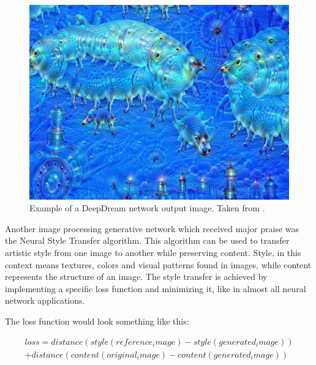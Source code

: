 \documentclass[b5paper]{book}
\let\cite\parencite
\begin{document}
\begin{figure}
    \centering
    \includegraphics[scale=0.2]{figures/deepdream.png}
    \caption{Example of a DeepDream network output image. Taken from \cite{chollet2018deep}.}
    \label{fig:deepdream}
\end{figure}

Another image processing generative network which received major praise was the Neural Style Transfer \cite{gatys2015neural} algorithm. This algorithm can be used to transfer artistic style from one image to another while preserving content. Style, in this context means textures, colors and visual patterns found in images, while content represents the structure of an image. The style transfer is achieved by implementing a specific loss function and minimizing it, like in almost all neural network applications.

The loss function would look something like this:

\begin{multline*}
loss = distance(style(reference_image) - style(generated_image))\\
+ distance(content(original_image) - content(generated_image))
\end{multline*}
\end{document}
